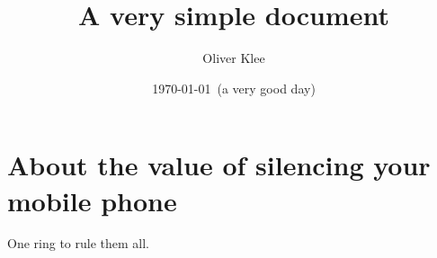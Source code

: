 \documentclass[a4paper]{scrartcl}
\title{A very simple document}
\author{Oliver Klee}
\date{\today\ (a very good day)}
\begin{document}
\maketitle

\section{About the value of silencing your mobile phone}

One ring to rule them all.
\end{document}
